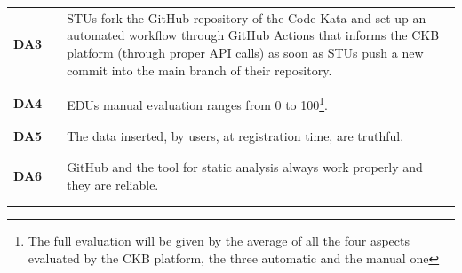 \begin{table}[H]
\begin{tabular}{l l p{10.5cm}}
        \textbf{DA3} & \vline & STUs fork the GitHub repository of the Code Kata and set up an automated workflow through GitHub Actions that informs the CKB platform (through proper API calls) as soon as STUs push a new commit into the main branch of their repository.       \\
                     &        &                                                                                                                                                                                                                                                     \\\hline & & \\
        \textbf{DA4} & \vline & EDUs manual evaluation ranges from 0 to 100\footnote{The full evaluation will be given by the average of all the four aspects evaluated by the CKB platform, the three automatic and the manual one}.                                               \\
                     &        &                                                                                                                                                                                                                                                     \\\hline & & \\
        \textbf{DA5} & \vline & The data inserted, by users, at registration  time, are truthful.                                                                                                                                                                                   \\
                     &        &                                                                                                                                                                                                                                                     \\\hline & & \\
        \textbf{DA6} & \vline & GitHub and the tool for static analysis always work properly and they are reliable.                                                                                                                                                                 \\
                     &        &                                                                                                                                                                                                                                                     \\\hline & & \\

\end{tabular}
\end{table}
